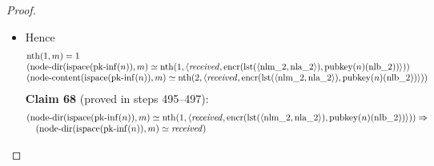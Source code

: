 \documentclass[11pt]{article}
\theoremstyle{plain}
\begin{document}
\begin{proof}
\begin{itemize}[leftmargin=2.8em, itemsep=4pt, parsep=1pt]
\begin{itemize}[leftmargin=2.8em, itemsep=4pt, parsep=1pt]
\begin{equation*}
\end{equation*}

  \item[\textbf{491--494}] Hence 
\begin{equation*}
\begin{array}{@{}l@{}}
\operatorname{nth}(1, m) = 1 \\
(\operatorname{node\text{-}dir}(\operatorname{ispace}(\operatorname{pk\text{-}inf}(n)), m) \simeq \operatorname{nth}(1, \langle \mathit{received}, \operatorname{encr}(\operatorname{lst}(\langle \operatorname{nlm\_2}, \operatorname{nla\_2} \rangle), \operatorname{pubkey}(n)(\operatorname{nlb\_2})) \rangle)) \\
(\operatorname{node\text{-}content}(\operatorname{ispace}(\operatorname{pk\text{-}inf}(n)), m) \simeq \operatorname{nth}(2, \langle \mathit{received}, \operatorname{encr}(\operatorname{lst}(\langle \operatorname{nlm\_2}, \operatorname{nla\_2} \rangle), \operatorname{pubkey}(n)(\operatorname{nlb\_2})) \rangle))
\end{array}
\end{equation*}
\textbf{Claim 68} (proved in steps 495--497):
\begin{equation*}
\begin{array}{@{}l@{}} (\operatorname{node\text{-}dir}(\operatorname{ispace}(\operatorname{pk\text{-}inf}(n)), m) \simeq \operatorname{nth}(1, \langle \mathit{received}, \operatorname{encr}(\operatorname{lst}(\langle \operatorname{nlm\_2}, \operatorname{nla\_2} \rangle), \operatorname{pubkey}(n)(\operatorname{nlb\_2})) \rangle)) \Rightarrow \\ \quad (\operatorname{node\text{-}dir}(\operatorname{ispace}(\operatorname{pk\text{-}inf}(n)), m) \simeq \mathit{received}) \end{array}
\end{equation*}


\end{itemize}
\end{itemize}
\end{proof}
\end{document}
